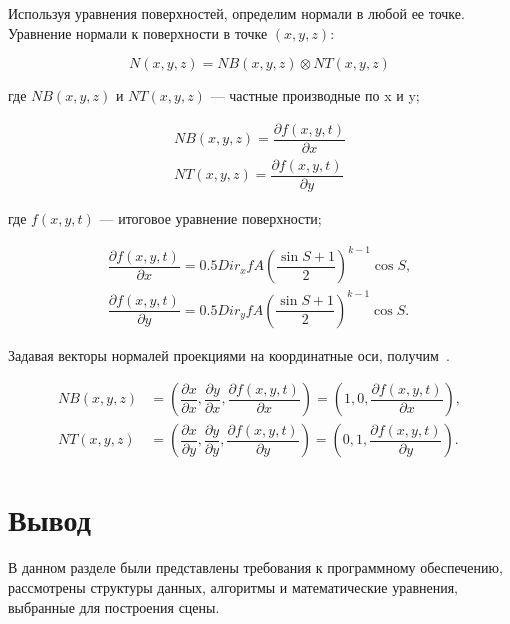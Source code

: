 Используя уравнения поверхностей, определим нормали в любой ее точке. 
Уравнение нормали к поверхности в точке $(x, y, z)$:

\begin{equation}
    N(x,y,z) = NB(x,y,z)\otimes NT(x,y,z)
\end{equation}

где $NB(x, y, z)$ и $NT(x, y, z)$ — частные производные по x и y;

\begin{align}
    NB(x, y, z) = \dfrac{\partial f(x,y,t)}{\partial x} \\
    NT(x, y, z) = \dfrac{\partial f(x,y,t)}{\partial y}
\end{align}

где $f(x, y, t)$ — итоговое уравнение поверхности;

\begin{align}
    \dfrac{\partial f(x,y,t)}{\partial x} = 0.5Dir_x f A\left(\dfrac{\sin{S} + 1}{2}\right)^{k-1}\cos{S}, \\
    \dfrac{\partial f(x,y,t)}{\partial y} = 0.5Dir_y f A\left(\dfrac{\sin{S} + 1}{2}\right)^{k-1}\cos{S}.
\end{align}


Задавая векторы нормалей проекциями на координатные оси, получим~\cite{WAVE}.

\begin{align}
    NB(x, y, z) &= \left(\dfrac{\partial x}{\partial x}, \dfrac{\partial y}{\partial x}, \dfrac{\partial f(x,y,t)}{\partial x}\right) = \left(1, 0, \dfrac{\partial f(x,y,t)}{\partial x}\right), \\
    NT(x, y, z) &= \left(\dfrac{\partial x}{\partial y}, \dfrac{\partial y}{\partial y}, \dfrac{\partial f(x,y,t)}{\partial y}\right) = \left(0, 1, \dfrac{\partial f(x,y,t)}{\partial y}\right).
\end{align}

\section*{Вывод}
В данном разделе были представлены требования к программному обеспечению, рассмотрены структуры данных, алгоритмы и математические уравнения, выбранные для построения сцены.
